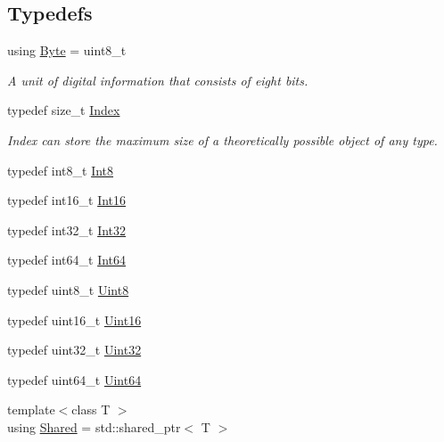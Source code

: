 \subsection*{Typedefs}
\begin{DoxyCompactItemize}
\item 
using \mbox{\hyperlink{namespacelibrary_1_1core_1_1types_ae37635b89098069fb3b8c5181edd0945}{Byte}} = uint8\+\_\+t
\begin{DoxyCompactList}\small\item\em A unit of digital information that consists of eight bits. \end{DoxyCompactList}\item 
typedef size\+\_\+t \mbox{\hyperlink{namespacelibrary_1_1core_1_1types_ad87eeb821d7067ec94e06ed1980d6350}{Index}}
\begin{DoxyCompactList}\small\item\em Index can store the maximum size of a theoretically possible object of any type. \end{DoxyCompactList}\item 
typedef int8\+\_\+t \mbox{\hyperlink{namespacelibrary_1_1core_1_1types_a31bb31acb8e07271b66571cf8e6eafee}{Int8}}
\item 
typedef int16\+\_\+t \mbox{\hyperlink{namespacelibrary_1_1core_1_1types_a150247fa2cd1b258b8e5950efcaecfc9}{Int16}}
\item 
typedef int32\+\_\+t \mbox{\hyperlink{namespacelibrary_1_1core_1_1types_acaf2598d96f2239dc55e54628da77876}{Int32}}
\item 
typedef int64\+\_\+t \mbox{\hyperlink{namespacelibrary_1_1core_1_1types_aaa5045e0d51ac9cff3c0aeff2b792c8c}{Int64}}
\item 
typedef uint8\+\_\+t \mbox{\hyperlink{namespacelibrary_1_1core_1_1types_a2fb690dd0eb982f92a642dbd0c985662}{Uint8}}
\item 
typedef uint16\+\_\+t \mbox{\hyperlink{namespacelibrary_1_1core_1_1types_a058aff3dd2661e18ff83255059561123}{Uint16}}
\item 
typedef uint32\+\_\+t \mbox{\hyperlink{namespacelibrary_1_1core_1_1types_a17d56f5d789f5d86d10828c112c77be2}{Uint32}}
\item 
typedef uint64\+\_\+t \mbox{\hyperlink{namespacelibrary_1_1core_1_1types_a52eb5d32552dff72468cc9acee3dd70e}{Uint64}}
\item 
{\footnotesize template$<$class T $>$ }\\using \mbox{\hyperlink{namespacelibrary_1_1core_1_1types_a3dae1a00f899bac0366794fa85eda8ee}{Shared}} = std\+::shared\+\_\+ptr$<$ T $>$

\end{DoxyCompactItemize}
